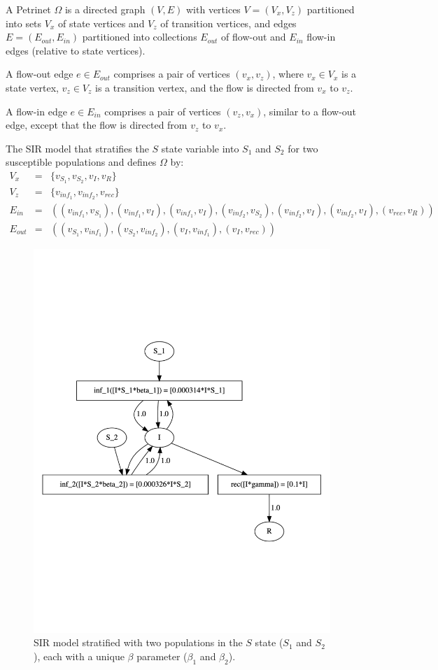 \begin{definition}
	A Petrinet $\Omega$ is a directed graph $(V, E)$ with vertices $V=(V_x,
		V_z)$ partitioned into sets $V_x$ of state vertices and $V_z$ of transition
	vertices, and edges $E=(E_{out}, E_{in})$ partitioned into collections $E_{out}$ of
	flow-out and $E_{in}$ flow-in edges (relative to state vertices).
\end{definition}



\begin{definition}
	A flow-out edge $e \in E_{out}$ comprises a pair of vertices $(v_x,v_z)$, where
	$v_x \in V_x$ is a state vertex, $v_z \in V_z$ is a transition vertex, and the
	flow is directed from $v_x$ to $v_z$.
\end{definition}

\begin{definition}
	A flow-in edge $e \in E_{in}$ comprises a pair of vertices $(v_z,v_x)$,
	similar to a flow-out edge, except that the flow is directed from $v_z$ to
	$v_x$.
\end{definition}

\begin{example}
	The SIR model that stratifies the $S$ state variable into $S_1$ and $S_2$
	for two susceptible populations and defines $\Omega$ by:
	\begin{eqnarray*}
		V_x &=& \{v_{S_1}, v_{S_2}, v_{I}, v_{R}\}\\
		V_z &=& \{v_{inf_1}, v_{inf_2}, v_{rec}\}\\
		E_{in} &=& ((v_{inf_1}, v_{S_1}), (v_{inf_1}, v_{I}), (v_{inf_1}, v_{I}), (v_{inf_2}, v_{S_2}), (v_{inf_2}, v_{I}),
		(v_{inf_2}, v_{I}), (v_{rec}, v_{R}))\\
		E_{out} &=& ((v_{S_1}, v_{inf_1}), (v_{S_2}, v_{inf_2}),(v_{I}, v_{inf_1}), (v_{I}, v_{rec}))
	\end{eqnarray*}
\end{example}

\begin{figure}
	\centering    \includegraphics[width=.5\linewidth]{fig/sir/sir_stratified_model.pdf}
	\caption{\label{fig:sir_stratified_model} SIR model stratified with two
		populations in the $S$ state ($S_1$ and $S_2$), each with a unique $\beta$
		parameter ($\beta_1$ and $\beta_2$).}
\end{figure}

